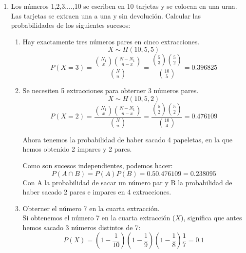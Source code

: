 \documentclass[11pt]{article}
\newcommand{\warning}{\textbf{\color{red}{ {\fontencoding{U}\fontfamily{futs}\selectfont\char 66\relax} }}}
\begin{document}
\begin{enumerate}
\begin{enumerate}
\item ¿Cúal es la probabilidad de que la vigésima unidad inspeccionada sea la segunda que se encuentra defectuosa?
\[
X \sim BN(2, 0.05)
\]
\[
P(X=18) = \binom{x+r-1}{x}(1-p)^xp^r=\binom{19}{18}(1-0.05)^{18}0.05^2=0.0188
\]

\item ¿Cuántas unidades deben inspeccionarse por término medio hasta encontrar 4 defectuosas?

\[
E[X] = \frac{r(1-p)}{p}=\frac{4(1-0.05)}{0.05} = 76 \Longrightarrow \text{Deben inspeccionarse } \underbrace{76+4=80}_{\warning} \text{ unidades.} 
\]

\item Calcular la desviación típica del número de unidades inspeccionadas hasta encontrar 4 defectuosas.
\[
Var[X] = \frac{r(1-p)}{p^2}=\frac{4(1-0.05)}{0.05^2}=1520 \Longrightarrow \sigma [X] = \sqrt{Var[X]} = 38.98717 \text{ inspecciones.}
\]

\end{enumerate}

\item Los números 1,2,3,...,10 se escriben en 10 tarjetas y se colocan en una urna. Las tarjetas se extraen una a una y sin devolución. Calcular las probabilidades de los siguientes sucesos:
\begin{enumerate}
\item Hay exactamente tres números pares en cinco extracciones.
\[
X \sim H(10,5,5)
\]
\[
P(X=3)=\frac{\binom{N_1}{x}\binom{N-N_1}{n-x}}{\binom{N}{n}}=\frac{\binom{5}{3}\binom{5}{2}}{\binom{10}{5}}=0.396825
\]
\item Se necesiten 5 extracciones para obterner 3 números pares.
\[
X \sim H(10, 5, 2)
\]
\[
P(X=2)=\frac{\binom{N_1}{x}\binom{N-N_1}{n-x}}{\binom{N}{n}}=\frac{\binom{5}{2}\binom{5}{2}}{\binom{10}{4}}=0.476109
\]

Ahora tenemos la probabilidad de haber sacado 4 papeletas, en la que hemos obtenido 2 impares y 2 pares. 

Como son sucesos independientes, podemos hacer:
\[
P(A\cap B)=P(A)P(B)=0.50.476109=0.238095
\]
Con A la probabilidad de sacar un número par y B la probabilidad de haber sacado 2 pares e impares en 4 extracciones.

\item Obterner el número 7 en la cuarta extracción. \\

Si obtenemos el número 7 en la cuarta extracción ($X$), significa que antes hemos sacado 3 números distintos de 7: 
\[
P(X)=(1-\frac{1}{10})(1-\frac{1}{9})(1-\frac{1}{8})\frac{1}{7} = 0.1
\]
\end{enumerate}


\end{enumerate}
\end{document}
